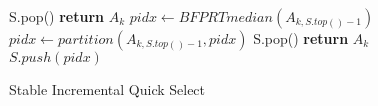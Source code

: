 \begin{figure}[!t]
\begin{algorithmic}[1]
	\State S.pop()
	\State \textbf{return} $A_{k}$
\EndIf
{}
	\State $pidx \gets BFPRTmedian(A_{k,S.top()-1})$
	\State $pidx \gets partition(A_{k,S.top()-1}, pidx)$
		\State S.pop()
		\State \textbf{return} $A_{k}$
	\EndIf	
	\State $S.push(pidx)$
\EndWhile \label{SIQS main cycle}
\EndProcedure
\end{algorithmic}
\caption{Stable Incremental Quick Select}\label{siqs}
\end{figure}